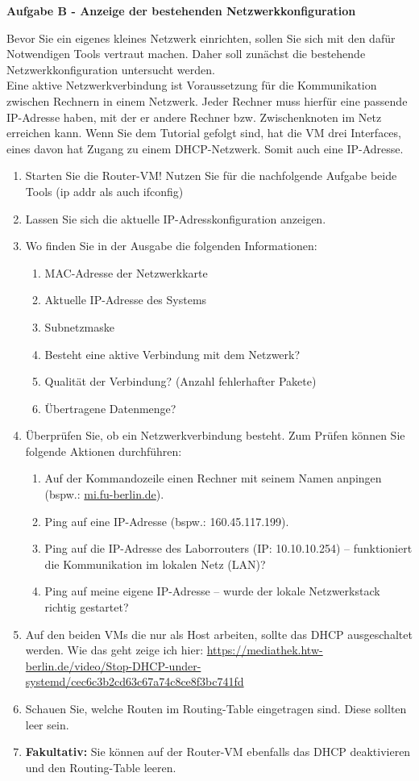\documentclass[paper=a4,fontsize=11pt]{scrartcl}%
\begin{document}
\begin{center}
\Large{\textbf{Aufgabe B - Anzeige der bestehenden Netzwerkkonfiguration}}
\end{center}
Bevor Sie ein eigenes kleines Netzwerk einrichten, sollen Sie sich mit den dafür Notwendigen Tools vertraut machen. Daher soll zunächst die bestehende Netzwerkkonfiguration untersucht werden.\\
Eine aktive Netzwerkverbindung ist Voraussetzung für die Kommunikation zwischen Rechnern in einem Netzwerk. Jeder Rechner muss hierfür eine passende IP-Adresse haben, mit der er andere Rechner bzw. Zwischenknoten im Netz erreichen kann. Wenn Sie dem Tutorial gefolgt sind, hat die VM drei Interfaces, eines davon hat Zugang zu einem DHCP-Netzwerk. Somit auch eine IP-Adresse.
\begin{enumerate}
	\item Starten Sie die Router-VM! Nutzen Sie für die nachfolgende Aufgabe beide Tools (ip addr als auch ifconfig)
	\item Lassen Sie sich die aktuelle IP-Adresskonfiguration anzeigen.
	\item Wo finden Sie in der Ausgabe die folgenden Informationen:
	\begin{enumerate}
		\item MAC-Adresse der Netzwerkkarte
		\item Aktuelle IP-Adresse des Systems
		\item Subnetzmaske
		\item Besteht eine aktive Verbindung mit dem Netzwerk?
		\item Qualität der Verbindung? (Anzahl fehlerhafter Pakete)
		\item Übertragene Datenmenge?
	\end{enumerate}
	\item Überprüfen Sie, ob ein Netzwerkverbindung besteht. Zum Prüfen können Sie folgende Aktionen durchführen:
	\begin{enumerate}
		\item Auf der Kommandozeile einen Rechner mit seinem Namen anpingen (bspw.: \url{mi.fu-berlin.de}).
		\item Ping auf eine IP-Adresse (bspw.: 160.45.117.199).
		\item Ping auf die IP-Adresse des Laborrouters (IP: 10.10.10.254) -- funktioniert die Kommunikation im lokalen Netz (LAN)?
		\item Ping auf meine eigene IP-Adresse -- wurde der lokale Netzwerkstack richtig gestartet?
	\end{enumerate}
	\item Auf den beiden VMs die nur als Host arbeiten, sollte das DHCP ausgeschaltet werden. Wie das geht zeige ich hier: \url{https://mediathek.htw-berlin.de/video/Stop-DHCP-under-systemd/cec6c3b2cd63c67a74c8ce8f3bc741fd}
	\item Schauen Sie, welche Routen im Routing-Table eingetragen sind. Diese sollten leer sein. 
	\item \textbf{Fakultativ:} Sie können auf der Router-VM ebenfalls das DHCP deaktivieren und den Routing-Table leeren.
\end{enumerate}
\end{document}
